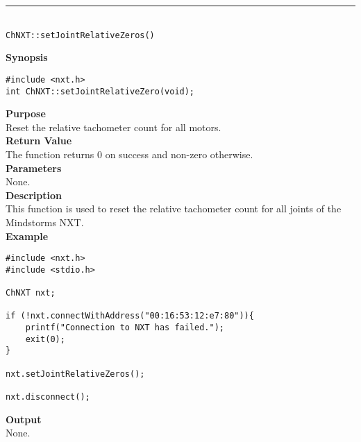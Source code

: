 \noindent
\vspace{5pt}
\rule{4.5in}{0.015in}\\
\noindent
{\LARGE \texttt{ChNXT::setJointRelativeZeros()} }\\


\noindent
{\bf Synopsis}
\vspace{-8pt}
\begin{verbatim}
#include <nxt.h>
int ChNXT::setJointRelativeZero(void);
\end{verbatim}

\noindent
{\bf Purpose}\\
Reset the relative tachometer count for all motors.\\

\noindent
{\bf Return Value}\\
The function returns 0 on success and non-zero otherwise.\\

\noindent
{\bf Parameters}\\
None.\\

\noindent
{\bf Description}\\
This function is used to reset the relative tachometer count for 
all joints of the Mindstorms NXT.\\

\noindent
{\bf Example}
\begin{verbatim}
#include <nxt.h> 
#include <stdio.h>

ChNXT nxt;

if (!nxt.connectWithAddress("00:16:53:12:e7:80")){
    printf("Connection to NXT has failed.");
    exit(0);
}
    
nxt.setJointRelativeZeros();

nxt.disconnect();
\end{verbatim}

\noindent
{\bf Output}\\
None.\\
\\
